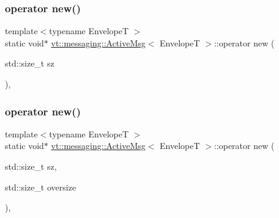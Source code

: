 \mbox{\label{structvt_1_1messaging_1_1_active_msg_ac79d16742251f19ed94f9725ed866f64}} 
\subsubsection{\texorpdfstring{operator new()}{operator new()}\hspace{0.1cm}{\footnotesize\ttfamily [1/3]}}
{\footnotesize\ttfamily template$<$typename EnvelopeT $>$ \\
static void$\ast$ \hyperlink{structvt_1_1messaging_1_1_active_msg}{vt\+::messaging\+::\+Active\+Msg}$<$ EnvelopeT $>$\+::operator new (\begin{DoxyParamCaption}\item[{std\+::size\+\_\+t}]{sz }\end{DoxyParamCaption})\hspace{0.3cm}{\ttfamily [inline]}, {\ttfamily [static]}}

\mbox{\label{structvt_1_1messaging_1_1_active_msg_ac13140f75e5238670c81589a84881ac1}} 
\subsubsection{\texorpdfstring{operator new()}{operator new()}\hspace{0.1cm}{\footnotesize\ttfamily [2/3]}}
{\footnotesize\ttfamily template$<$typename EnvelopeT $>$ \\
static void$\ast$ \hyperlink{structvt_1_1messaging_1_1_active_msg}{vt\+::messaging\+::\+Active\+Msg}$<$ EnvelopeT $>$\+::operator new (\begin{DoxyParamCaption}\item[{std\+::size\+\_\+t}]{sz,  }\item[{std\+::size\+\_\+t}]{oversize }\end{DoxyParamCaption})\hspace{0.3cm}{\ttfamily [inline]}, {\ttfamily [static]}}

